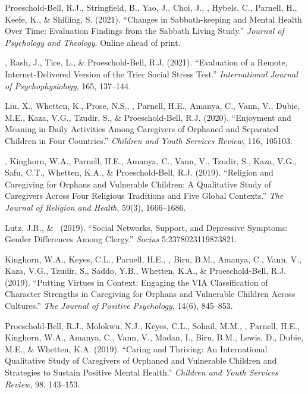\begin{etaremune}
\item Proeschold-Bell, R.J., Stringfield, B., Yao, J., Choi, J., \Eagle, Hybels, C., Parnell, H., Keefe, K., \& Shilling, S. (2021). ``Changes in Sabbath-keeping and Mental Health Over Time: Evaluation Findings from the Sabbath Living Study.'' \emph{Journal of Psychology and Theology}. Online ahead of print. 

\item \Eagle, Rash, J., Tice, L., \& Proeschold-Bell, R.J. (2021). ``Evaluation of a Remote, Internet-Delivered Version of the Trier Social Stress Test.'' \emph{International Journal of Psychophysiology}, 165, 137--144. 

\item Liu, X., Whetten, K., Prose, N.S., \Eagle, Parnell, H.E., Amanya, C., Vann, V., Dubie, M.E., Kaza, V.G., Tzudir, S., \& Proeschold-Bell, R.J. (2020). ``Enjoyment and Meaning in Daily Activities Among Caregivers of Orphaned and Separated Children in Four Countries.'' \emph{Children and Youth Services Review}, 116, 105103. 

\item \Eagle, Kinghorn, W.A., Parnell, H.E., Amanya, C., Vann, V., Tzudir, S., Kaza, V.G., Safu, C.T., Whetten, K.A., \& Proeschold-Bell, R.J. (2019). ``Religion and Caregiving for Orphans and Vulnerable Children: A Qualitative Study of Caregivers Across Four Religious Traditions and Five Global Contexts.'' \emph{The Journal of Religion and Health}, 59(3), 1666--1686. 

\item Lutz, J.R., \& \Eagle\CS\ (2019). ``Social Networks, Support, and Depressive Symptoms: Gender Differences Among Clergy.'' \emph{Socius} 5:2378023119873821. 

\item Kinghorn, W.A., Keyes, C.L., Parnell, H.E., \Eagle, Biru, B.M., Amanya, C., Vann, V., Kaza, V.G., Tzudir, S., Saddo, Y.B., Whetten, K.A., \& Proeschold-Bell, R.J. (2019). ``Putting Virtues in Context: Engaging the VIA Classification of Character Strengths in Caregiving for Orphans and Vulnerable Children Across Cultures.'' \emph{The Journal of Positive Psychology}, 14(6), 845--853. 

\item Proeschold-Bell, R.J., Molokwu, N.J., Keyes, C.L., Sohail, M.M., \Eagle, Parnell, H.E., Kinghorn, W.A., Amanya, C., Vann, V., Madan, I., Biru, B.M., Lewis, D., Dubie, M.E., \& Whetten, K.A. (2019). ``Caring and Thriving: An International Qualitative Study of Caregivers of Orphaned and Vulnerable Children and Strategies to Sustain Positive Mental Health.'' \emph{Children and Youth Services Review}, 98, 143--153. 


\end{etaremune}
